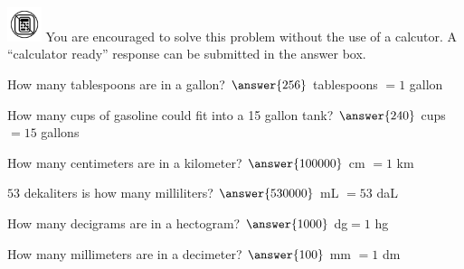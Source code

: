 \documentclass{ximera}
\author{David Kish}
\begin{document}
\includegraphics[width=1cm]{nocalc.PNG} You are encouraged to solve this problem without the use of a calcutor. A ``calculator ready'' response can be submitted in the answer box.
\begin{exercise}
 How many tablespoons are in a gallon? 
 $\answer{256}$ tablespoons $= 1$ gallon
 \end{exercise}
  \begin{exercise}
 How many cups of gasoline could fit into a 15 gallon tank?
 $\answer{240}$ cups $= 15$ gallons
 \end{exercise}
  \begin{exercise}
 How many centimeters are in a kilometer? 
 $\answer{100000}$ cm $= 1$ km
 \end{exercise}
   \begin{exercise}
 $53$ dekaliters is how many milliliters?
 $\answer{530000}$ mL $= 53$ daL
 \end{exercise}
   \begin{exercise}
 How many decigrams are in a hectogram? 
$ \answer{1000}$ dg$ = 1$ hg
 \end{exercise}
   \begin{exercise}
 How many millimeters are in a decimeter?
 $\answer{100}$ mm $= 1$ dm
 \end{exercise}
\end{document}
